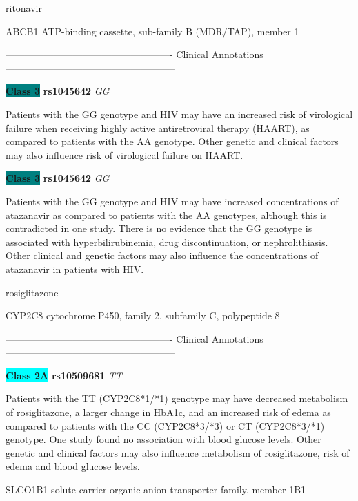 \documentclass{resume} %
\begin{document}
\begin{rSection}{ ritonavir }
\begin{rSubsection}{ ABCB1 }{ ATP-binding cassette, sub-family B (MDR/TAP), member 1 }{}{}
\item[] ---------------------------------------------------- Clinical Annotations -----------------------------------------------------\newline
\item \textbf{\colorbox{teal} {Class 3}} \textbf{ rs1045642 } \textit{ GG }
\item[] Patients with the GG genotype and HIV may have an increased risk of virological failure when receiving highly active antiretroviral therapy (HAART), as compared to patients with the AA genotype. Other genetic and clinical factors may also influence risk of virological failure on HAART.\item \textbf{\colorbox{teal} {Class 3}} \textbf{ rs1045642 } \textit{ GG }
\item[] Patients with the GG genotype and HIV may have increased concentrations of atazanavir as compared to patients with the AA genotypes, although this is contradicted in one study. There is no evidence that the GG genotype is associated with hyperbilirubinemia, drug discontinuation, or nephrolithiasis.  Other clinical and genetic factors may also influence the concentrations of atazanavir in patients with HIV. 
\end{rSubsection}

\end{rSection}\begin{rSection}{ rosiglitazone }
\item[]

\begin{rSubsection}{ CYP2C8 }{ cytochrome P450, family 2, subfamily C, polypeptide 8 }{}{}
\item[]

\item[] ---------------------------------------------------- Clinical Annotations -----------------------------------------------------\newline
\item \textbf{\colorbox{cyan} {Class 2A}} \textbf{ rs10509681 } \textit{ TT }
\item[] Patients with the TT (CYP2C8*1/*1) genotype may have decreased metabolism of rosiglitazone, a larger change in HbA1c, and an increased risk of edema as compared to patients with the CC (CYP2C8*3/*3) or CT (CYP2C8*3/*1) genotype. One study found no association with blood glucose levels. Other genetic and clinical factors may also influence metabolism of rosiglitazone, risk of edema and blood glucose levels.
\end{rSubsection}\begin{rSubsection}{ SLCO1B1 }{ solute carrier organic anion transporter family, member 1B1 }{}{}
\item[]


\end{rSubsection}
\end{rSection}
\end{document}
